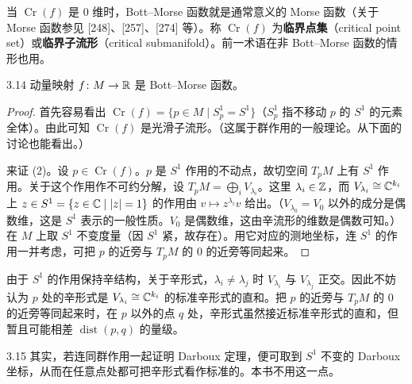 
当 $\operatorname{Cr}(f)$ 是 0 维时，Bott–Morse 函数就是通常意义的 Morse 函数（关于 Morse 函数参见 [248]、[257]、[274] 等）。称 $\operatorname{Cr}(f)$ 为\textbf{临界点集}（critical point set）或\textbf{临界子流形}（critical submanifold）。前一术语在非 Bott–Morse 函数的情形也用。

\begin{theorem*}{3.14}
  动量映射 $f\colon M\to\mathbb{R}$ 是 Bott–Morse 函数。
\end{theorem*}

\begin{proof}
  首先容易看出 $\operatorname{Cr}(f)=\{p\in M\mid S^1_p=S^1\}$（$S^1_p$ 指不移动 $p$ 的 $S^1$ 的元素全体）。由此可知 $\operatorname{Cr}(f)$ 是光滑子流形。（这属于群作用的一般理论。从下面的讨论也能看出。）

  来证 (2)。设 $p\in\operatorname{Cr}(f)$。$p$ 是 $S^1$ 作用的不动点，故切空间 $T_pM$ 上有 $S^1$ 作用。关于这个作用作不可约分解，设 $T_pM=\bigoplus_iV_{\lambda_i}$。这里 $\lambda_i\in\mathbb{Z}$，而 $V_{\lambda_i}\cong\mathbb{C}^{k_i}$ 上 $z\in S^1=\{z\in\mathbb{C}\mid|z|=1\}$ 的作用由 $v\mapsto z^{\lambda_i}v$ 给出。（$V_{\lambda_0}=V_0$ 以外的成分是偶数维，这是 $S^1$ 表示的一般性质。$V_0$ 是偶数维，这由辛流形的维数是偶数可知。）在 $M$ 上取 $S^1$ 不变度量（因 $S^1$ 紧，故存在）。用它对应的测地坐标，连 $S^1$ 的作用一并考虑，可把 $p$ 的近旁与 $T_pM$ 的 $0$ 的近旁等同起来。
\end{proof}

由于 $S^1$ 的作用保持辛结构，关于辛形式，$\lambda_i\neq\lambda_j$ 时 $V_{\lambda_i}$ 与 $V_{\lambda_j}$ 正交。因此不妨认为 $p$ 处的辛形式是 $V_{\lambda_i}\cong\mathbb{C}^{k_i}$ 的标准辛形式的直和。把 $p$ 的近旁与 $T_pM$ 的 $0$ 的近旁等同起来时，在 $p$ 以外的点 $q$ 处，辛形式虽然接近标准辛形式的直和，但暂且可能相差 $\operatorname{dist}(p,q)$ 的量级。


\begin{remark}{3.15}
  其实，若连同群作用一起证明 Darboux 定理，便可取到 $S^1$ 不变的 Darboux 坐标，从而在任意点处都可把辛形式看作标准的。本书不用这一点。
\end{remark}

